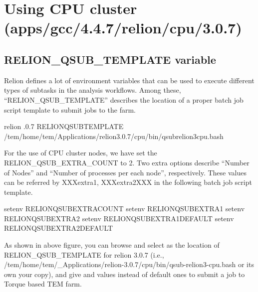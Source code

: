 \documentclass[letterpaper,10pt,english]{sphinxmanual}
\begin{document}
\section{Using CPU cluster (apps/gcc/4.4.7/relion/cpu/3.0.7)}
\label{\detokenize{relion:using-cpu-cluster-apps-gcc-4-4-7-relion-cpu-3-0-7}}

\subsection{RELION\_QSUB\_TEMPLATE variable}
\label{\detokenize{relion:relion-qsub-template-variable}}
Relion defines a lot of environment variables that can be used to execute different types of subtasks in the analysis workflows. Among these, “RELION\_QSUB\_TEMPLATE” describes the location of a proper batch job script template to submit jobs to the farm.

\begin{sphinxVerbatim}[commandchars=\\\{\}]
 relion .0.7 RELION\PYGZus{}QSUB\PYGZus{}TEMPLATE /tem/home/tem/\PYGZus{}Applications/relion\PYGZhy{}3.0.7/cpu/bin/qsub\PYGZhy{}relion3\PYGZhy{}cpu.bash
\end{sphinxVerbatim}

For the use of CPU cluster nodes, we have set the RELION\_QSUB\_EXTRA\_COUNT to 2. Two extra options describe “Number of Nodes” and “Number of processes per each node”, respectively. These values can be referred by XXXextra1, XXXextra2XXX in the following batch job script template.

\begin{sphinxVerbatim}[commandchars=\\\{\}]
setenv RELION\PYGZus{}QSUB\PYGZus{}EXTRA\PYGZus{}COUNT 
setenv RELION\PYGZus{}QSUB\PYGZus{}EXTRA1 
setenv RELION\PYGZus{}QSUB\PYGZus{}EXTRA2 
setenv RELION\PYGZus{}QSUB\PYGZus{}EXTRA1\PYGZus{}DEFAULT 
setenv RELION\PYGZus{}QSUB\PYGZus{}EXTRA2\PYGZus{}DEFAULT 
\end{sphinxVerbatim}


As shown in above figure, you can browse and select  as the location of RELION\_QSUB\_TEMPLATE for relion 3.0.7 (i.e., /tem/home/tem/\_Applications/relion-3.0.7/cpu/bin/qsub-relion3-cpu.bash or its own your copy), and give  and  values instead of default ones to submit a job to Torque based TEM farm.
\end{document}
